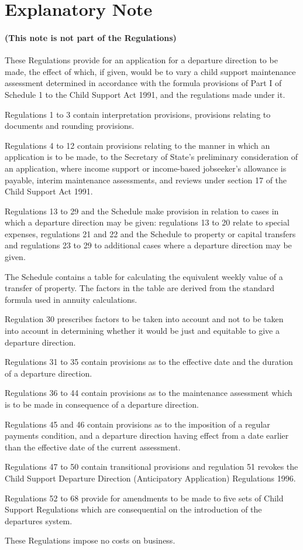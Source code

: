 \documentclass[a4paper]{article}
\newcommand{\parthead}{}
\begin{document}
\part{Explanatory Note}

\renewcommand\parthead{--- Explanatory Note}

\subsection*{(This note is not part of the Regulations)}

These Regulations provide for an application for a departure direction to be
made, the effect of which, if given, would be to vary a child support
maintenance assessment determined in accordance with the formula provisions of
Part I of Schedule 1 to the Child Support Act 1991, and the regulations made
under it.

Regulations 1 to 3 contain interpretation provisions, provisions relating to
documents and rounding provisions.

Regulations 4 to 12 contain provisions relating to the manner in which an
application is to be made, to the Secretary of State’s preliminary consideration
of an application, where income support or income-based jobseeker’s allowance is
payable, interim maintenance assessments, and reviews under section 17 of the
Child Support Act 1991.

Regulations 13 to 29 and the Schedule make provision in relation to cases in
which a departure direction may be given: regulations 13 to 20 relate to special
expenses, regulations 21 and 22 and the Schedule to property or capital
transfers and regulations 23 to 29 to additional cases where a departure
direction may be given.

The Schedule contains a table for calculating the equivalent weekly value of a
transfer of property. The factors in the table are derived from the standard
formula used in annuity calculations.

Regulation 30 prescribes factors to be taken into account and not to be taken
into account in determining whether it would be just and equitable to give a
departure direction.

Regulations 31 to 35 contain provisions as to the effective date and the
duration of a departure direction.

Regulations 36 to 44 contain provisions as to the maintenance assessment which
is to be made in consequence of a departure direction.

Regulations 45 and 46 contain provisions as to the imposition of a regular
payments condition, and a departure direction having effect from a date earlier
than the effective date of the current assessment.

Regulations 47 to 50 contain transitional provisions and regulation 51 revokes
the Child Support Departure Direction (Anticipatory Application) Regulations
1996.

Regulations 52 to 68 provide for amendments to be made to five sets of Child
Support Regulations which are consequential on the introduction of the
departures system.

  These Regulations impose no costs on business.
\end{document}
